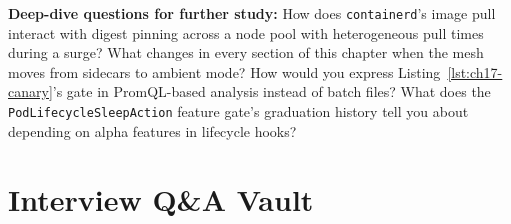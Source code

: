 \textbf{Deep-dive questions for further study:} How does
\texttt{containerd}'s image pull interact with digest pinning across a
node pool with heterogeneous pull times during a surge? What changes in
every section of this chapter when the mesh moves from sidecars to
ambient mode? How would you express Listing~\ref{lst:ch17-canary}'s gate
in PromQL-based analysis instead of batch files? What does the
\texttt{PodLifecycleSleepAction} feature gate's graduation history tell
you about depending on alpha features in lifecycle hooks?

\section{Interview Q\&A Vault}
\label{sec:ch17-interview}

